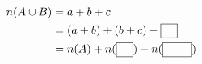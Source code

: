 $\begin{aligned} n(A\cup B)&=a+b+c\\ &=(a+b)+(b+c)-\blank\\ &=n(A)+n(\blank)-n(\blank[2.6em]) \end{aligned}$
